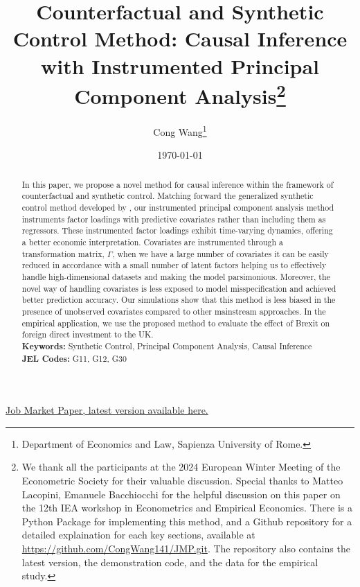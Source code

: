 \documentclass[12pt]{article}
\begin{document}
\begin{titlepage}
    \title{Counterfactual and Synthetic Control Method: Causal Inference with Instrumented Principal Component Analysis\thanks{We thank all the participants at the 2024 European Winter Meeting of the Econometric Society for their valuable discussion. Special thanks to Matteo Lacopini, Emanuele Bacchiocchi for the helpful discussion on this paper on the 12th IEA workshop in Econometrics and Empirical Economics. There is a Python Package for implementing this method, and a Github repository for a detailed explaination for each key sections, available at \href{https://github.com/CongWang141/JMP.git}{https://github.com/CongWang141/JMP.git}. The repository also contains the latest version, the demonstration code, and the data for the empirical study.}} 

    \author{Cong Wang\thanks{Department of Economics and Law, Sapienza University of Rome.}}
    \date{\today}
    \maketitle
    \begin{center}
        \href{https://github.com/CongWang141/JMP/blob/main/latex/main.pdf}{Job Market Paper, latest version available here.}
    \end{center}

    \begin{abstract}
        \noindent In this paper, we propose a novel method for causal inference within the framework of counterfactual and synthetic control. Matching forward the generalized synthetic control method developed by \cite{xu2017generalized}, our instrumented principal component analysis method instruments factor loadings with predictive covariates rather than including them as regressors. These instrumented factor loadings exhibit time-varying dynamics, offering a better economic interpretation. Covariates are instrumented through a transformation matrix, $\Gamma$, when we have a large number of covariates it can be easily reduced in accordance with a small number of latent factors helping us to effectively handle high-dimensional datasets and making the model parsimonious. Moreover, the novel way of handling covariates is less exposed to model misspecification and achieved better prediction accuracy. Our simulations show that this method is less biased in the presence of unobserved covariates compared to other mainstream approaches. In the empirical application, we use the proposed method to evaluate the effect of Brexit on foreign direct investment to the UK.\\

        \noindent\textbf{Keywords:} Synthetic Control, Principal Component Analysis, Causal Inference\\
        \noindent\textbf{JEL Codes:} G11, G12, G30\\
        \bigskip
    \end{abstract}

    \setcounter{page}{0}
    \thispagestyle{empty}
\end{titlepage}
\end{document}
